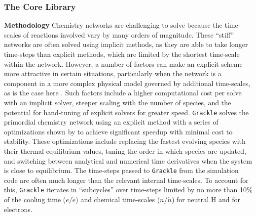 \documentclass[11pt]{article}
\newcommand{\grackle}{\texttt{Grackle}}
\begin{document}
\begin{flushleft}
\subsubsection{The Core Library}
\label{sec:core-library}

\noindent
{\bf Methodology}
Chemistry networks are challenging to solve because the time-scales of
reactions involved vary by many orders of magnitude.  These ``stiff''
networks are often solved using implicit methods, as they are able to
take longer time-steps than explicit methods, which are limited by the
shortest time-scale within the network.  However, a number of factors
can make an explicit scheme more attractive in certain situations,
particularly when the network is a component in a more complex physical
model governed by additional time-scales, as is the case here
\citep{2012JCoPh.231.5266G}.  Such factors include a higher
computational cost per solve with an implicit solver, steeper scaling
with the number of species, and the potential for hand-tuning of
explicit solvers for greater speed.  \grackle{} solves the primordial
chemistry network using an explicit method with a series of
optimizations shown by \citet{1997NewA....2..181A} to achieve
significant speedup with minimal cost to stability.  These
optimizations include replacing the fastest evolving species with
their thermal equilibrium values, tuning the order in which species
are updated, and switching between analytical and numerical time
derivatives when the system is close to equilibrium.  The time-steps
passed to \grackle{} from the simulation code are often much longer
than the relevant internal
time-scales.  To account for this, \grackle{} iterates in
``subcycles'' over time-steps limited by no more than 10\% of the
cooling time ($e/\dot{e}$) and chemical time-scales ($n/\dot{n}$) for
neutral H and for electrons.


\end{flushleft}
\end{document}
